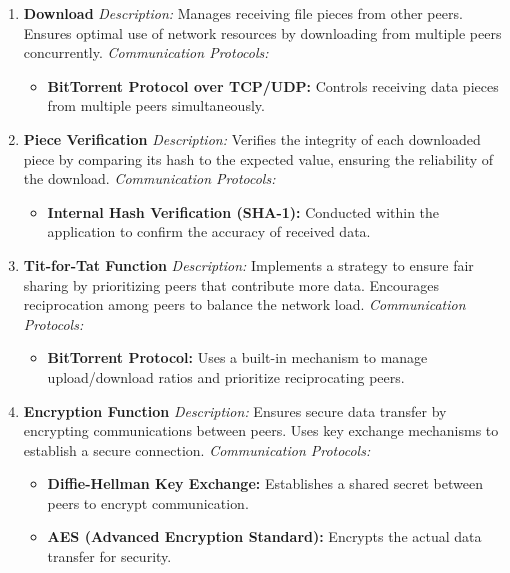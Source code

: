 \documentclass[a4paper]{article}
\begin{document}
\begin{enumerate}[label=\textbf{\arabic*.}, leftmargin=*, itemsep=10pt]
    \item \textbf{Download}  
    \textit{Description:} Manages receiving file pieces from other peers. Ensures optimal use of network resources by downloading from multiple peers concurrently.  
    \textit{Communication Protocols:}
    \begin{itemize}
        \item \textbf{BitTorrent Protocol over TCP/UDP:} Controls receiving data pieces from multiple peers simultaneously.
    \end{itemize}

    \item \textbf{Piece Verification}  
    \textit{Description:} Verifies the integrity of each downloaded piece by comparing its hash to the expected value, ensuring the reliability of the download.  
    \textit{Communication Protocols:}
    \begin{itemize}
        \item \textbf{Internal Hash Verification (SHA-1):} Conducted within the application to confirm the accuracy of received data.
    \end{itemize}

    \item \textbf{Tit-for-Tat Function}  
    \textit{Description:} Implements a strategy to ensure fair sharing by prioritizing peers that contribute more data. Encourages reciprocation among peers to balance the network load.  
    \textit{Communication Protocols:}
    \begin{itemize}
        \item \textbf{BitTorrent Protocol:} Uses a built-in mechanism to manage upload/download ratios and prioritize reciprocating peers.
    \end{itemize}

    \item \textbf{Encryption Function}  
    \textit{Description:} Ensures secure data transfer by encrypting communications between peers. Uses key exchange mechanisms to establish a secure connection.  
    \textit{Communication Protocols:}
    \begin{itemize}
        \item \textbf{Diffie-Hellman Key Exchange:} Establishes a shared secret between peers to encrypt communication.
        \item \textbf{AES (Advanced Encryption Standard):} Encrypts the actual data transfer for security.
    \end{itemize}


\end{enumerate}
\end{document}
